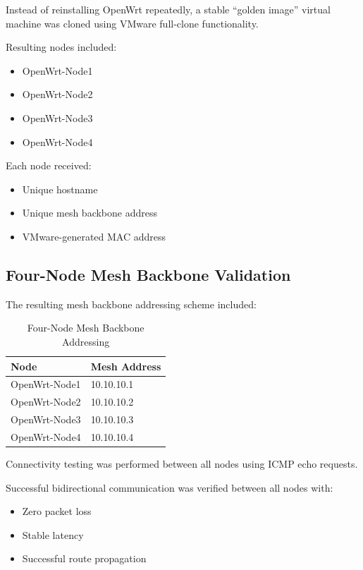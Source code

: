 \documentclass[conference]{IEEEtran}
\begin{document}
Instead of reinstalling OpenWrt repeatedly, a stable “golden image” virtual machine was cloned using VMware full-clone functionality.

Resulting nodes included:

\begin{itemize}
    \item OpenWrt-Node1
    \item OpenWrt-Node2
    \item OpenWrt-Node3
    \item OpenWrt-Node4
\end{itemize}

Each node received:

\begin{itemize}
    \item Unique hostname
    \item Unique mesh backbone address
    \item VMware-generated MAC address
\end{itemize}

\subsection{Four-Node Mesh Backbone Validation}

The resulting mesh backbone addressing scheme included:

\begin{table}[H]
\centering
\caption{Four-Node Mesh Backbone Addressing}
\begin{tabular}{|l|l|}
\hline
Node & Mesh Address \\ \hline
OpenWrt-Node1 & 10.10.10.1 \\ \hline
OpenWrt-Node2 & 10.10.10.2 \\ \hline
OpenWrt-Node3 & 10.10.10.3 \\ \hline
OpenWrt-Node4 & 10.10.10.4 \\ \hline
\end{tabular}
\end{table}

Connectivity testing was performed between all nodes using ICMP echo requests.

Successful bidirectional communication was verified between all nodes with:

\begin{itemize}
    \item Zero packet loss
    \item Stable latency
    \item Successful route propagation
\end{itemize}
\end{document}
